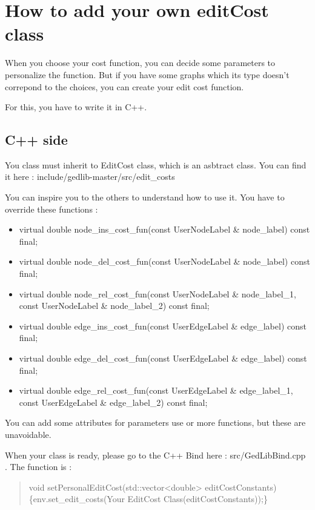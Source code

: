 \documentclass[letterpaper,10pt,english]{sphinxmanual}
\begin{document}
\chapter{How to add your own editCost class}
\label{editcost:how-to-add-your-own-editcost-class}\label{editcost::doc}
When you choose your cost function, you can decide some parameters to personalize the function. But if you have some graphs which its type doesn't correpond to the choices, you can create your edit cost function.

For this, you have to write it in C++.


\section{C++ side}
\label{editcost:c-side}
You class must inherit to EditCost class, which is an asbtract class. You can find it here : include/gedlib-master/src/edit\_costs

You can inspire you to the others to understand how to use it. You have to override these functions :
\begin{itemize}
\item {} 
virtual double node\_ins\_cost\_fun(const UserNodeLabel \& node\_label) const final;

\item {} 
virtual double node\_del\_cost\_fun(const UserNodeLabel \& node\_label) const final;

\item {} 
virtual double node\_rel\_cost\_fun(const UserNodeLabel \& node\_label\_1, const UserNodeLabel \& node\_label\_2) const final;

\item {} 
virtual double edge\_ins\_cost\_fun(const UserEdgeLabel \& edge\_label) const final;

\item {} 
virtual double edge\_del\_cost\_fun(const UserEdgeLabel \& edge\_label) const final;

\item {} 
virtual double edge\_rel\_cost\_fun(const UserEdgeLabel \& edge\_label\_1, const UserEdgeLabel \& edge\_label\_2) const final;

\end{itemize}

You can add some attributes for parameters use or more functions, but these are unavoidable.

When your class is ready, please go to the C++ Bind here : src/GedLibBind.cpp . The function is :
\begin{quote}

void setPersonalEditCost(std::vector\textless{}double\textgreater{} editCostConstants)\{env.set\_edit\_costs(Your EditCost Class(editCostConstants));\}
\end{quote}
\end{document}
